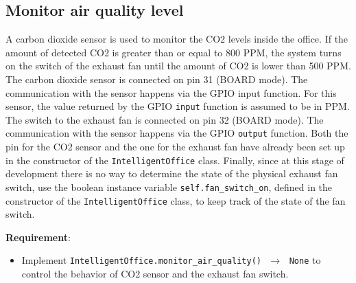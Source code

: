 \subsection{Monitor air quality level}
A carbon dioxide sensor is used to monitor the CO2 levels inside the office. If the amount of detected CO2 is greater than or equal to 800 PPM, the system turns on the switch of the exhaust fan until the amount of CO2 is lower than 500 PPM.
The carbon dioxide sensor is connected on pin 31 (BOARD mode). The communication with the sensor happens via the GPIO input function. For this sensor, the value returned by the GPIO \texttt{input} function is assumed to be in PPM. 
The switch to the exhaust fan is connected on pin 32 (BOARD mode). The communication with the sensor happens via the GPIO \texttt{output} function.
Both the pin for the CO2 sensor and the one for the exhaust fan have already been set up in the constructor of the \texttt{IntelligentOffice} class. 
Finally, since at this stage of development there is no way to determine the state of the physical exhaust fan switch, use the boolean instance variable \texttt{self.fan\_switch\_on}, defined in the constructor of the \texttt{IntelligentOffice} class, to keep track of the state of the fan switch.

\noindent\textbf{Requirement}:
\begin{itemize}
    \item Implement \texttt{IntelligentOffice.monitor\_air\_quality() $\,\to\,$ None} to control the behavior of CO2 sensor and the exhaust fan switch.
\end{itemize}
